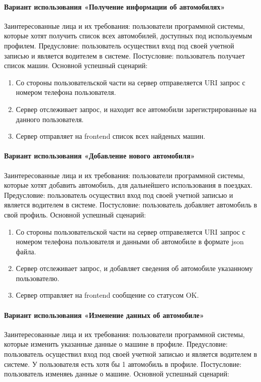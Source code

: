 \paragraph{Вариант использования «Получение информации об автомобилях»}
Заинтересованные лица и их требования: пользователи программной системы, которые хотят получить список всех автомобилей, доступных под используемым профилем. Предусловие: пользователь осуществил вход под своей учетной записью и является водителем в системе. Постусловие: пользователь получает список машин.
Основной успешный сценарий:

\begin{enumerate}
	\item Со стороны пользовательской части на сервер отправеляется URI запрос с номером телефона пользователя.
	\item Сервер отслеживает запрос, и находит все автомобили зарегистрированные на данного пользователя.
	\item Сервер отправляет на frontend список всех найденых машин.
\end{enumerate}

\paragraph{Вариант использования «Добавление нового автомобиля»}
Заинтересованные лица и их требования: пользователи программной системы, которые хотят добавить автомобиль, для дальнейшего использования в поездках. Предусловие: пользователь осуществил вход под своей учетной записью и является водителем в системе. Постусловие: пользователь добавляет автомобиль в свой профиль.
Основной успешный сценарий:

\begin{enumerate}
	\item Со стороны пользовательской части на сервер отправеляется URI запрос с номером телефона пользователя и данными об автомобиле в формате json файла.
	\item Сервер отслеживает запрос, и добавляет сведения об автомобиле указанному пользователю.
	\item Сервер отправляет на frontend сообщение со статусом OK.
\end{enumerate}

\paragraph{Вариант использования «Изменение данных об автомобиле»}
Заинтересованные лица и их требования: пользователи программной системы, которые изменить указанные данные о машине в профиле. Предусловие: пользователь осуществил вход под своей учетной записью и является водителем в системе. У пользователя есть хотя бы 1 автомобиль в профиле. Постусловие: пользователь изменяеь данные о машине.
Основной успешный сценарий:

